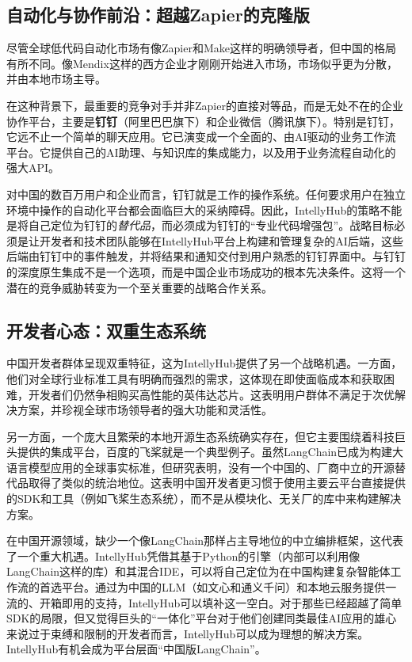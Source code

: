 \documentclass[11点, A4纸, 单面]{article}
\begin{document}
\subsection{自动化与协作前沿：超越Zapier的克隆版}
尽管全球低代码自动化市场有像Zapier和Make这样的明确领导者\cite{MakeAlternatives, MakeAlternatives2, MakeVsZapier}，但中国的格局有所不同。像Mendix这样的西方企业才刚刚开始进入市场\cite{MendixChina}，市场似乎更为分散，并由本地市场主导。

在这种背景下，最重要的竞争对手并非Zapier的直接对等品，而是无处不在的企业协作平台，主要是\textbf{钉钉}（阿里巴巴旗下）和企业微信（腾讯旗下）。特别是钉钉，它远不止一个简单的聊天应用。它已演变成一个全面的、由AI驱动的业务工作流平台。它提供自己的AI助理、与知识库的集成能力，以及用于业务流程自动化的强大API\cite{DingTalkAI, DingTalkAPI}。

对中国的数百万用户和企业而言，钉钉就是工作的操作系统。任何要求用户在独立环境中操作的自动化平台都会面临巨大的采纳障碍。因此，IntellyHub的策略不能是将自己定位为钉钉的\textit{替代品}，而必须成为钉钉的“专业代码增强包”。战略目标必须是让开发者和技术团队能够在IntellyHub平台上构建和管理复杂的AI后端，这些后端由钉钉中的事件触发，并将结果和通知交付到用户熟悉的钉钉界面中。与钉钉的深度原生集成不是一个选项，而是中国企业市场成功的根本先决条件。这将一个潜在的竞争威胁转变为一个至关重要的战略合作关系。

\subsection{开发者心态：双重生态系统}
中国开发者群体呈现双重特征，这为IntellyHub提供了另一个战略机遇。一方面，他们对全球行业标准工具有明确而强烈的需求，这体现在即使面临成本和获取困难，开发者们仍然争相购买高性能的英伟达芯片\cite{NvidiaPreference}。这表明用户群体不满足于次优解决方案，并珍视全球市场领导者的强大功能和灵活性。

另一方面，一个庞大且繁荣的本地开源生态系统确实存在，但它主要围绕着科技巨头提供的集成平台，百度的飞桨就是一个典型例子\cite{PaddlePaddleDevs, PaddlePaddleEcosystem}。虽然LangChain已成为构建大语言模型应用的全球事实标准\cite{IntellyHubBP}，但研究表明，没有一个中国的、厂商中立的开源替代品取得了类似的统治地位\cite{LangChainAlternatives, AIAgentFrameworks, ChineseLLMs}。这表明中国开发者更习惯于使用主要云平台直接提供的SDK和工具（例如飞桨生态系统），而不是从模块化、无关厂的库中来构建解决方案。

在中国开源领域，缺少一个像LangChain那样占主导地位的中立编排框架，这代表了一个重大机遇。IntellyHub凭借其基于Python的引擎（内部可以利用像LangChain这样的库）和其混合IDE，可以将自己定位为在中国构建复杂智能体工作流的首选平台。通过为中国的LLM（如文心和通义千问）和本地云服务提供一流的、开箱即用的支持，IntellyHub可以填补这一空白。对于那些已经超越了简单SDK的局限，但又觉得巨头的“一体化”平台对于他们创建同类最佳AI应用的雄心来说过于束缚和限制的开发者而言，IntellyHub可以成为理想的解决方案。IntellyHub有机会成为平台层面“中国版LangChain”。
\end{document}
